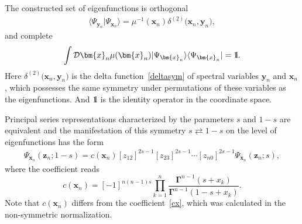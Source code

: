 \documentclass[10pt,a4paper]{amsart}
\newcommand{\II}{\hbox{{1}\kern-.25em\hbox{l}}}
\numberwithin{equation}{section}
\begin{document}
The constructed set of eigenfunctions is orthogonal
\begin{align*}
\langle\Psi_{\bm{y}_n}|\Psi_{\bm{x}_n}\rangle = \mu^{-1}(\bm{x}_n)
\delta^{(2)}\bigl(\bm{x}_n,\bm{y}_n \bigr) ,
\end{align*}
and complete
\begin{equation*}
\int \mathcal{D}\bm{x}_n \mu(\bm{x}_n)
|\Psi_{\bm{x}_n}\rangle \langle\Psi_{\bm{x}_n}| = \II .
\end{equation*}
Here $\delta^{(2)}\bigl(\bm{x}_n,\bm{y}_n \bigr)$ is the delta function~\eqref{deltasym} of spectral variables $\bm{y}_n$ and $\bm{x}_n$, which possesses the same symmetry under permutations of these variables as the eigenfunctions. And $\II$ is the identity operator in the coordinate space.

Principal series representations characterized by the
parameters $s$ and $1-s$ are equivalent and the manifestation
of this symmetry $s \rightleftarrows 1-s$ on the level of eigenfunctions
has the form
\begin{align*}
\Psi_{\bm x_n}(\bm z_n;1-s) = c(\bm{x}_n)
[z_{12}]^{2s-1} [z_{23}]^{2s-1}
\cdots [z_{n0}]^{2s-1} \Psi_{\bm x_n}(\bm z_n;s) ,
\end{align*}
where the coefficient reads
\begin{equation*}
	c(\bm{x}_n) = [-1]^{n(n-1)s} \prod\limits_{k=1}^n \frac{\mathbf{\Gamma}^{n-1}(s+x_k)}{\mathbf{\Gamma}^{n-1}(1-s+x_k)} .
\end{equation*}
Note that $c(\bm{x}_n)$ differs from the coefficient~\eqref{cx}, which was calculated in the non-symmetric normalization.
\end{document}
